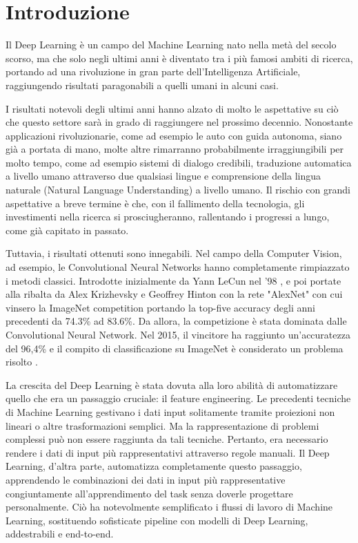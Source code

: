 

\chapter*{Introduzione}

Il Deep Learning è un campo del Machine Learning nato nella metà del secolo scorso, ma che solo negli ultimi anni è diventato tra i più famosi ambiti di ricerca, portando ad una rivoluzione in gran parte dell'Intelligenza Artificiale, raggiungendo risultati paragonabili a quelli umani in alcuni casi.

I risultati notevoli degli ultimi anni hanno alzato di molto le aspettative su ciò che questo settore sarà in grado di raggiungere nel prossimo decennio. Nonostante applicazioni rivoluzionarie, come ad esempio le auto con guida autonoma, siano già a portata di mano, molte altre rimarranno probabilmente irraggiungibili per molto tempo, come ad esempio sistemi di dialogo credibili, traduzione automatica a livello umano attraverso due qualsiasi lingue e comprensione della lingua naturale (Natural Language Understanding) a livello umano. Il rischio con grandi aspettative a breve termine è che, con il fallimento della tecnologia, gli investimenti nella ricerca si prosciugheranno, rallentando i progressi a lungo, come già capitato in passato.

Tuttavia, i risultati ottenuti sono innegabili. Nel campo della Computer Vision, ad esempio, le Convolutional Neural Networks hanno completamente rimpiazzato i metodi classici. Introdotte inizialmente da Yann LeCun nel '98 \cite{lecun1998gradient}, e poi portate alla ribalta da Alex Krizhevsky e Geoffrey Hinton con la rete "AlexNet" \cite{krizhevsky2012imagenet} con cui vinsero la ImageNet competition portando la top-five accuracy degli anni precedenti da 74.3\% ad 83.6\%. Da allora, la competizione è stata dominata dalle Convolutional Neural Network. Nel 2015, il vincitore ha raggiunto un'accuratezza del 96,4\% e il compito di classificazione su ImageNet è considerato un problema risolto \cite{francois2017deep}.

La crescita del Deep Learning è stata dovuta alla loro abilità di automatizzare quello che era un passaggio cruciale: il feature engineering. Le precedenti tecniche di Machine Learning gestivano i dati input solitamente tramite proiezioni non lineari o altre trasformazioni semplici. Ma la rappresentazione di problemi complessi può non essere raggiunta da tali tecniche. Pertanto, era necessario rendere i dati di input più rappresentativi attraverso regole manuali. Il Deep Learning, d'altra parte, automatizza completamente questo passaggio, apprendendo le combinazioni dei dati in input più rappresentative congiuntamente all'apprendimento del task senza doverle progettare personalmente. Ciò ha notevolmente semplificato i flussi di lavoro di Machine Learning, sostituendo sofisticate pipeline con modelli di Deep Learning, addestrabili e end-to-end.

